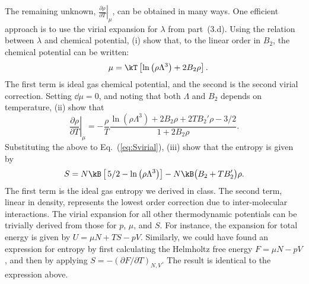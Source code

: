 \smallskip \subp
The remaining unknown,
$\left.\frac{\partial \rho}{\partial T}\right|_{\mu}$,
can be obtained in many ways.
One efficient approach is to use the virial
expansion for $\lambda$ from part~(3.d).
Using the relation between $\lambda$ and chemical potential,
(i) show that, to the linear order in $B_2$,
the chemical potential can be written:
\begin{align*}
\quad \mu = \kT \left[
  \ln\left(\rho \Lambda^3\right) + 2 B_2 \rho \right].
\end{align*}
The first term is ideal gas chemical potential,
and the second is the second virial correction.
Setting $\dd \mu = 0$,
and noting that both $\Lambda$ and $B_2$ depends
on temperature, (ii) show that
$$
\left.\frac{\partial \rho}{\partial T}\right|_{\mu}
= - \frac{\rho}{T} \frac{\ln\left(\rho\Lambda^3\right)
  + 2B_2\rho + 2TB_2'\rho - 3/2} {1 + 2 B_2\rho} .
$$
Substituting the above to Eq.~(\ref{eq:Svirial}),
(iii) show that the entropy is given by
$$
S = N\kB \left[\, 5/2 - \ln\left(\rho\Lambda^3\right)
\right] - N\kB \bigl(B_2 + TB_2'\bigr) \rho .
$$
The first term is the ideal gas entropy we derived in class.
The second term, linear in density,
represents the lowest order
correction due to inter-molecular interactions.
The virial expansion for all other thermodynamic potentials
can be trivially derived from those for $p$, $\mu$, and $S$.
For instance, the expansion for total energy
is given by $U = \mu N + TS - pV$.
Similarly, we could have found an expression for entropy
by first calculating the Helmholtz free energy $F = \mu N - pV$,
and then by applying $S = - (\partial F / \partial T)_{N, V}$.
The result is identical to the expression above.
